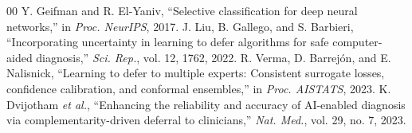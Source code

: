 \documentclass[conference]{IEEEtran}
\begin{document}
\begin{thebibliography}{00}
 Y. Geifman and R. El-Yaniv, ``Selective classification for deep neural networks,'' in \emph{Proc. NeurIPS}, 2017.
 J. Liu, B. Gallego, and S. Barbieri, ``Incorporating uncertainty in learning to defer algorithms for safe computer-aided diagnosis,'' \emph{Sci. Rep.}, vol. 12, 1762, 2022.
 R. Verma, D. Barrej\'{o}n, and E. Nalisnick, ``Learning to defer to multiple experts: Consistent surrogate losses, confidence calibration, and conformal ensembles,'' in \emph{Proc. AISTATS}, 2023.
 K. Dvijotham \emph{et al.}, ``Enhancing the reliability and accuracy of AI-enabled diagnosis via complementarity-driven deferral to clinicians,'' \emph{Nat. Med.}, vol. 29, no. 7, 2023.
\end{thebibliography}
\end{document}
